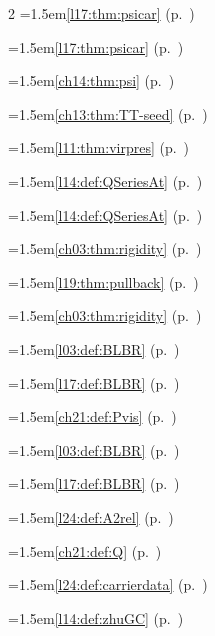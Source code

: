 \begin{multicols}{2}
\hangindent=1.5em\quad \ref{l17:thm:psicar} (p.~\pageref{l17:thm:psicar})\par
\hangindent=1.5em\quad \ref{l17:thm:psicar} (p.~\pageref{l17:thm:psicar})\par
\hangindent=1.5em\quad \ref{ch14:thm:psi} (p.~\pageref{ch14:thm:psi})\par
\hangindent=1.5em\quad \ref{ch13:thm:TT-seed} (p.~\pageref{ch13:thm:TT-seed})\par
\hangindent=1.5em\quad \ref{l11:thm:virpres} (p.~\pageref{l11:thm:virpres})\par
\hangindent=1.5em\quad \ref{l14:def:QSeriesAt} (p.~\pageref{l14:def:QSeriesAt})\par
\hangindent=1.5em\quad \ref{l14:def:QSeriesAt} (p.~\pageref{l14:def:QSeriesAt})\par
\hangindent=1.5em\quad \ref{ch03:thm:rigidity} (p.~\pageref{ch03:thm:rigidity})\par
\hangindent=1.5em\quad \ref{l19:thm:pullback} (p.~\pageref{l19:thm:pullback})\par
\hangindent=1.5em\quad \ref{ch03:thm:rigidity} (p.~\pageref{ch03:thm:rigidity})\par
\hangindent=1.5em\quad \ref{l03:def:BLBR} (p.~\pageref{l03:def:BLBR})\par
\hangindent=1.5em\quad \ref{l17:def:BLBR} (p.~\pageref{l17:def:BLBR})\par
\hangindent=1.5em\quad \ref{ch21:def:Pvis} (p.~\pageref{ch21:def:Pvis})\par
\hangindent=1.5em\quad \ref{l03:def:BLBR} (p.~\pageref{l03:def:BLBR})\par
\hangindent=1.5em\quad \ref{l17:def:BLBR} (p.~\pageref{l17:def:BLBR})\par
\par{}\par\nopagebreak\smallskip
\hangindent=1.5em\quad \ref{l24:def:A2rel} (p.~\pageref{l24:def:A2rel})\par
\hangindent=1.5em\quad \ref{ch21:def:Q} (p.~\pageref{ch21:def:Q})\par
\hangindent=1.5em\quad \ref{l24:def:carrierdata} (p.~\pageref{l24:def:carrierdata})\par
\hangindent=1.5em\quad \ref{l14:def:zhuGC} (p.~\pageref{l14:def:zhuGC})\par

\end{multicols}

